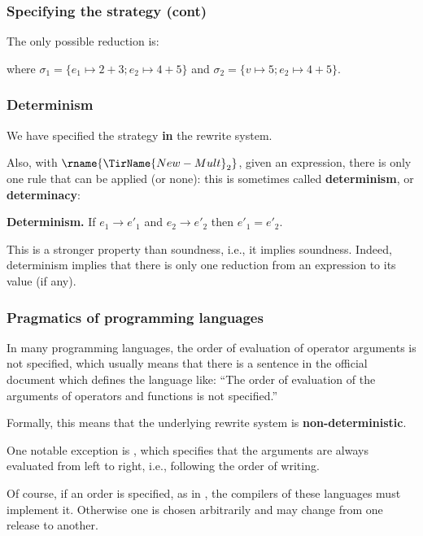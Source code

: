 %
\begin{frame}
\frametitle{Specifying the strategy (cont)}

The only possible reduction is:
where \(\sigma_1=\{e_1 \mapsto 2+3; e_2 \mapsto 4+5\}\) and
\(\sigma_2=\{v \mapsto 5; e_2 \mapsto 4+5\}\).

\end{frame}

%
\begin{frame}
\frametitle{Determinism}

We have specified the strategy \textbf{in} the rewrite system.

\bigskip

Also, with \(\rname{\TirName{New-Mult}_2}\), given an expression,
there is only one rule that can be applied (or none): this is
sometimes called \textbf{determinism}, or \textbf{determinacy}:

\bigskip

\textbf{Determinism.} If \(e_1 \rightarrow e'_1\) and \(e_2
\rightarrow e'_2\) then \(e'_1 = e'_2\).

\bigskip

This is a stronger property than soundness, i.e., it implies
soundness. Indeed, determinism implies that there is only one
reduction from an expression to its value (if any).

\end{frame}

%
\begin{frame}
\frametitle{Pragmatics of programming languages}

In many programming languages, the order of evaluation of operator
arguments is not specified, which usually means that there is a
sentence in the official document which defines the language like:
``The order of evaluation of the arguments of operators and functions
is not specified.''

\bigskip

\noindent Formally, this means that the underlying rewrite system is
\textbf{non-deterministic}.

\bigskip

One notable exception is \Java, which specifies that the arguments are
always evaluated from left to right, i.e., following the order of
writing.

\bigskip

Of course, if an order is specified, as in \Java, the compilers of
these languages must implement it. Otherwise one is chosen
arbitrarily and may change from one release to another.

\end{frame}

